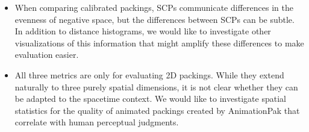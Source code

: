 \begin{itemize}
\item {}
When comparing calibrated packings, SCPs communicate 
  differences in the evenness of negative space, but the differences 
  between SCPs can be subtle.  In addition to distance histograms, 
  we would like to investigate other visualizations of this information
  that might amplify these differences to make evaluation easier.

\item {}
All three metrics are only for evaluating 2D packings.
  While they extend naturally to three purely spatial
  dimensions, it is not clear whether they can be 
  adapted to the spacetime context.  
  We would like to investigate
  spatial statistics for the quality of animated packings created by AnimationPak that correlate
  with human perceptual judgments.

\end{itemize}



